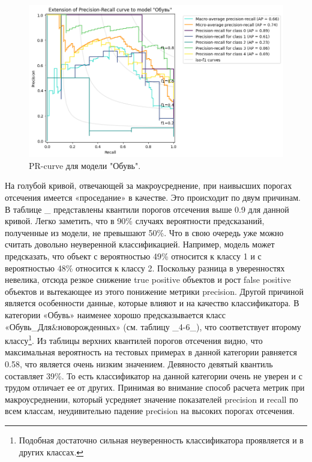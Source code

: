 \documentclass[a4paper,12pt]{extarticle}
\begin{document}
\begin{figure}[ht]
	\centering
	\includegraphics[scale=0.6]{pr_curves/prcurve_Обувь.png}
	\caption{PR-curve для модели "Обувь".}
	\label{fig:prcurve_Обувь2}
\end{figure}

На голубой кривой, отвечающей за макроусреднение, при наивысших порогах отсечения имеется «проседание» в качестве. Это происходит по двум причинам. В таблице \_ представлены квантили порогов отсечения выше 0.9 для данной кривой. Легко заметить, что в 90\% случаях вероятности предсказаний, полученные из модели, не превышают 50\%. Что в свою очередь уже можно считать довольно неуверенной классификацией. Например, модель может предсказать, что объект с вероятностью 49\% относится к классу 1 и с вероятностью 48\% относится к классу 2. Поскольку разница в уверенностях невелика, отсюда резкое снижение true positive объектов и рост false positive объектов и вытекающее из этого понижение метрики precision. Другой причиной является особенности данные, которые влияют и на качество классификатора. В категории «Обувь» наименее хорошо предсказывается класс «Обувь\_Для\&новорожденных» (см. таблицу \_4-6\_), что соответствует второму классу\footnote{Подобная достаточно сильная неуверенность классификатора проявляется и в других классах.}. Из таблицы верхних квантилей порогов отсечения видно, что максимальная вероятность на тестовых примерах в данной категории равняется 0.58, что является очень низким значением. Девяносто девятый квантиль составляет 39\%. То есть классификатор на данной категории очень не уверен и с трудом отличает ее от других. Принимая во внимание способ расчета метрик при макроусреднении, который усредняет значение показателей precision и recall по всем классам, неудивительно падение preсision на высоких порогах отсечения.
\end{document}

